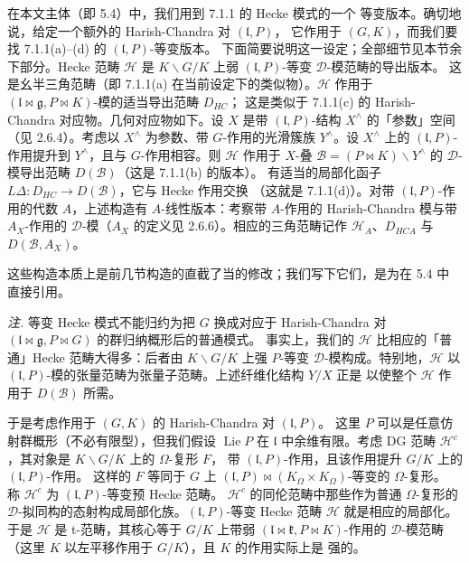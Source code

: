
 在本文主体（即 5.4）中，我们用到 7.1.1 的 Hecke 模式的一个
等变版本。确切地说，给定一个额外的 Harish-Chandra 对 $(\mathfrak{l},P)$，
它作用于 $(G,K)$，而我们要找 7.1.1(a)--(d) 的 $(\mathfrak{l},P)$-等变版本。
下面简要说明这一设定；全部细节见本节余下部分。Hecke 范畴 $\mathcal{H}$ 是
$K\backslash G/K$ 上弱 $(\mathfrak{l},P)$-等变 $\mathcal{D}$-模范畴的导出版本。
这是幺半三角范畴（即 7.1.1(a) 在当前设定下的类似物）。$\mathcal{H}$ 作用于
$(\mathfrak{l}\bowtie\mathfrak{g},P\bowtie K)$-模的适当导出范畴 $D_{HC}$；
这是类似于 7.1.1(c) 的 Harish-Chandra 对应物。几何对应物如下。设 $X$ 是带
$(\mathfrak{l},P)$-结构 $X^{\wedge}$ 的「参数」空间（见 2.6.4）。考虑以
$X^{\wedge}$ 为参数、带 $G$-作用的光滑簇族 $Y^{\wedge}$。设 $X^{\wedge}$ 上的
$(\mathfrak{l},P)$-作用提升到 $Y^{\wedge}$，且与 $G$-作用相容。则 $\mathcal{H}$
作用于 $X$-叠 $\mathcal{B}=(P\bowtie K)\backslash Y^{\wedge}$ 的
$\mathcal{D}$-模导出范畴 $D(\mathcal{B})$（这是 7.1.1(b) 的版本）。
有适当的局部化函子 $L\Delta:D_{HC}\to D(\mathcal{B})$，它与 Hecke 作用交换
（这就是 7.1.1(d)）。对带 $(\mathfrak{l},P)$-作用的代数 $A$，上述构造有
$A$-线性版本：考察带 $A$-作用的 Harish-Chandra 模与带 $A_{X}$-作用的
$\mathcal{D}$-模（$A_{X}$ 的定义见 2.6.6）。相应的三角范畴记作
$\mathcal{H}_{A}$、$D_{HCA}$ 与 $D(\mathcal{B},A_{X})$。


这些构造本质上是前几节构造的直截了当的修改；我们写下它们，是为在 5.4 中
直接引用。

\emph{注.} 等变 Hecke 模式不能归约为把 $G$ 换成对应于 Harish-Chandra 对
$(\mathfrak{l}\bowtie\mathfrak{g},P\bowtie G)$ 的群归纳概形后的普通模式。
事实上，我们的 $\mathcal{H}$ 比相应的「普通」Hecke 范畴大得多：后者由
$K\backslash G/K$ 上强 $P$-等变 $\mathcal{D}$-模构成。特别地，$\mathcal{H}$
以 $(\mathfrak{l},P)$-模的张量范畴为张量子范畴。上述纤维化结构 $Y/X$ 正是
以使整个 $\mathcal{H}$ 作用于 $D(\mathcal{B})$ 所需。

 于是考虑作用于 $(G,K)$ 的 Harish-Chandra 对 $(\mathfrak{l},P)$。
这里 $P$ 可以是任意仿射群概形（不必有限型），但我们假设
$\operatorname{Lie}P$ 在 $\mathfrak{l}$ 中余维有限。考虑 DG 范畴
$\mathcal{H}^{c}$，其对象是 $K\backslash G/K$ 上的 $\Omega$-复形 $F$，
带 $(\mathfrak{l},P)$-作用，且该作用提升 $G/K$ 上的 $(\mathfrak{l},P)$-作用。
这样的 $F$ 等同于 $G$ 上
$(\mathfrak{l},P)\bowtie(K_{\Omega}\times K_{\Omega})$-等变的 $\Omega$-复形。
称 $\mathcal{H}^{c}$ 为 $(\mathfrak{l},P)$-等变预 Hecke 范畴。
$\mathcal{H}^{c}$ 的同伦范畴中那些作为普通 $\Omega$-复形的
$\mathcal{D}$-拟同构的态射构成局部化族。$(\mathfrak{l},P)$-等变 Hecke 范畴
$\mathcal{H}$ 就是相应的局部化。于是 $\mathcal{H}$ 是 t-范畴，其核心等于
$G/K$ 上带弱 $(\mathfrak{l}\bowtie\mathfrak{k},P\bowtie K)$-作用的
$\mathcal{D}$-模范畴（这里 $K$ 以左平移作用于 $G/K$），且 $K$ 的作用实际上是
强的。

